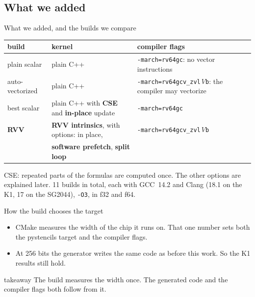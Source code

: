 \documentclass[aspectratio=169,10pt,t]{beamer}
\newcommand{\term}[1]{\textcolor{psblue!85!black}{\textbf{#1}}} %
\newcommand{\code}[1]{\texttt{#1}}
\newcommand{\takeaway}[1]{\par\vfill
  \begin{beamercolorbox}[wd=\textwidth,sep=4pt,rounded=true]{takeaway}
    \small #1
  \end{beamercolorbox}}
\begin{document}
\subsection{What we added}
\begin{frame}{What we added, and the builds we compare}
  \vspace{2mm}
  \centering

  \vspace{4mm}
  {\footnotesize\renewcommand{\arraystretch}{1.12}
  \begin{tabular}{@{}lll@{}}
    \toprule
    \textbf{build} & \textbf{kernel} & \textbf{compiler flags}\\
    \midrule
    plain scalar & plain C++ & \code{-march=rv64gc}: no vector instructions\\
    auto-vectorized & plain C++ & \code{-march=rv64gcv\_zvl}\textit{V}\code{b}: the compiler may vectorize\\
    best scalar & plain C++ with \term{CSE} and \term{in-place} update & \code{-march=rv64gc}\\
    \textbf{RVV} & \textbf{RVV intrinsics}, with options: in place, & \code{-march=rv64gcv\_zvl}\textit{V}\code{b}\\
    & \hspace{1em}\term{software prefetch}, \term{split loop} & \\
    \bottomrule
  \end{tabular}\par}

  \vspace{2mm}
  {\scriptsize\color{psgray}CSE: repeated parts of the formulas are computed once. The other options are explained
  later. 11 builds in total, each with GCC~14.2 and Clang (18.1 on the K1, 17 on the SG2044), \code{-O3}, in f32
  and f64.\par}
\end{frame}

\begin{frame}{How the build chooses the target}
  \vspace{4mm}
  \centering\resizebox{\textwidth}{!}{}

  \vspace{4mm}
  \raggedright
  \begin{itemize}\small
    \item CMake measures the width of the chip it runs on. That one number sets both the pystencils target and the
          compiler flags.
    \item At 256 bits the generator writes the same code as before this work. So the K1 results still hold.
  \end{itemize}
  \takeaway{The build measures the width once. The generated code and the compiler flags both follow from it.}
\end{frame}
\end{document}
